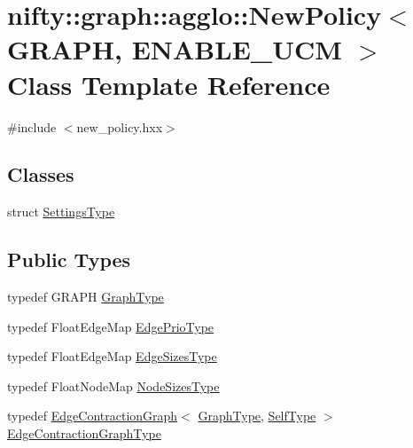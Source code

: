 \hypertarget{classnifty_1_1graph_1_1agglo_1_1NewPolicy}{}\section{nifty\+:\+:graph\+:\+:agglo\+:\+:New\+Policy$<$ G\+R\+A\+PH, E\+N\+A\+B\+L\+E\+\_\+\+U\+CM $>$ Class Template Reference}
\label{classnifty_1_1graph_1_1agglo_1_1NewPolicy}


{\ttfamily \#include $<$new\+\_\+policy.\+hxx$>$}

\subsection*{Classes}
\begin{DoxyCompactItemize}
\item 
struct \hyperlink{structnifty_1_1graph_1_1agglo_1_1NewPolicy_1_1SettingsType}{Settings\+Type}
\end{DoxyCompactItemize}
\subsection*{Public Types}
\begin{DoxyCompactItemize}
\item 
typedef G\+R\+A\+PH \hyperlink{classnifty_1_1graph_1_1agglo_1_1NewPolicy_ac8758b09604128d2bded40975109e808}{Graph\+Type}
\item 
typedef Float\+Edge\+Map \hyperlink{classnifty_1_1graph_1_1agglo_1_1NewPolicy_a19a7b9c67786f9dbf1dfb3c92aef141c}{Edge\+Prio\+Type}
\item 
typedef Float\+Edge\+Map \hyperlink{classnifty_1_1graph_1_1agglo_1_1NewPolicy_ae2cee465b05f3ba70c44b2769e8bc750}{Edge\+Sizes\+Type}
\item 
typedef Float\+Node\+Map \hyperlink{classnifty_1_1graph_1_1agglo_1_1NewPolicy_a77d4a9bba74fd8bd0adfae7058ce934e}{Node\+Sizes\+Type}
\item 
typedef \hyperlink{classnifty_1_1graph_1_1EdgeContractionGraph}{Edge\+Contraction\+Graph}$<$ \hyperlink{classnifty_1_1graph_1_1agglo_1_1NewPolicy_ac8758b09604128d2bded40975109e808}{Graph\+Type}, \hyperlink{classnifty_1_1graph_1_1agglo_1_1NewPolicy}{Self\+Type} $>$ \hyperlink{classnifty_1_1graph_1_1agglo_1_1NewPolicy_a704192e6cafc4bfba6071564ea52e17c}{Edge\+Contraction\+Graph\+Type}
\end{DoxyCompactItemize}
